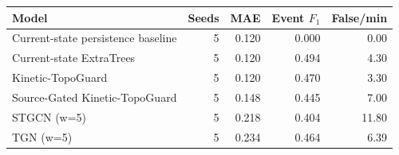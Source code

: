 \begin{tabular}{lrrrr}
\toprule
Model & Seeds & MAE & Event $F_1$ & False/min \\
\midrule
Current-state persistence baseline & 5 & 0.120 & 0.000 & 0.00 \\
Current-state ExtraTrees & 5 & 0.120 & 0.494 & 4.30 \\
Kinetic-TopoGuard & 5 & 0.120 & 0.470 & 3.30 \\
Source-Gated Kinetic-TopoGuard & 5 & 0.148 & 0.445 & 7.00 \\
STGCN (w=5) & 5 & 0.218 & 0.404 & 11.80 \\
TGN (w=5) & 5 & 0.234 & 0.464 & 6.39 \\
\bottomrule
\end{tabular}
